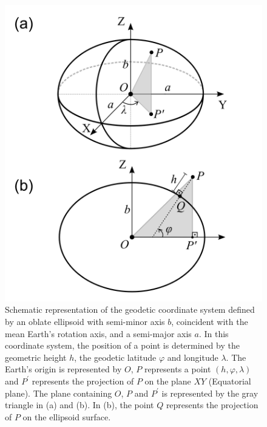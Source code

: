 \documentclass[extra]{gji}
\begin{document}
\begin{figure}
    \includegraphics{figures/geodetic_coordinates.png}
    \caption{Schematic representation of the geodetic coordinate
    system defined by an oblate ellipsoid with semi-minor axis $b$, 
    coincident with the mean Earth's rotation axis, and a semi-major
    axis $a$. In this coordinate system, the position of a point is
    determined by the geometric height $h$, the geodetic latitude 
    $\varphi$ and longitude $\lambda$. The Earth's origin is represented 
    by $O$, $P$ represents a point $(h, \varphi, \lambda)$ and 
    $P^{\prime}$ represents the projection of $P$ on the plane $XY$ 
    (Equatorial plane). The plane containing $O$, $P$ and 
    $P^{\prime}$ is represented by the gray triangle in (a) and (b). 
    In (b), the point $Q$ represents the projection of $P$ on the 
    ellipsoid surface.}
  \label{fig:fig1}
\end{figure}

\label{lastpage}
\end{document}
